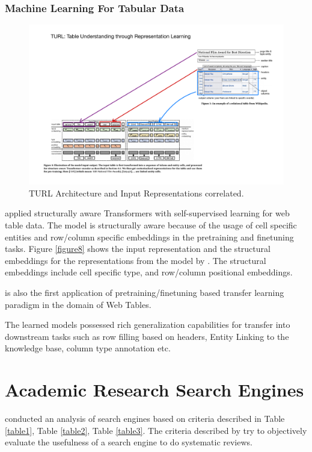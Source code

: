 \subsubsection{Machine Learning For Tabular Data}
\begin{figure}[h]
    \centering
    \includegraphics[width=\maxwidth{\textwidth}]{src/images/TURL-model-exp.pdf}
    \caption{TURL Architecture and Input Representations correlated. }
    \label{figure\arabic{figurecounter}}
\end{figure}
\cite{deng2020turl} applied structurally aware Transformers with self-supervised learning for web table data. The model is structurally aware because of the usage of cell specific entities and row/column specific embeddings in the pretraining and finetuning tasks. Figure \ref{figure8} shows the input representation and the structural embeddings for the representations from the model by \cite{deng2020turl}. The structural embeddings include cell specific type, and row/column positional embeddings. 

\cite{deng2020turl} is also the first application of pretraining/finetuning based transfer learning paradigm in the domain of Web Tables. 

The learned models possessed rich generalization capabilities for transfer into downstream tasks such as row filling based on headers, Entity Linking to the knowledge base, column type annotation etc. 


\section{Academic Research Search Engines}
\label{relatedwork:acad-search-engine}
\cite{gusenbauer2020academic} conducted an analysis of search engines based on criteria described in Table \ref{table1}, Table \ref{table2}, Table \ref{table3}.
The criteria described by \cite{gusenbauer2020academic} try to objectively evaluate the usefulness of a search engine to do systematic reviews.

